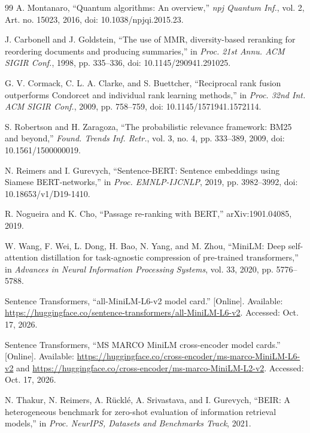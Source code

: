\documentclass[conference]{IEEEtran}
\begin{document}
\begin{thebibliography}{99}
A. Montanaro, ``Quantum algorithms: An overview,'' \textit{npj Quantum Inf.}, vol. 2, Art. no. 15023, 2016, doi: 10.1038/npjqi.2015.23.

J. Carbonell and J. Goldstein, ``The use of MMR, diversity-based reranking for reordering documents and producing summaries,'' in \textit{Proc. 21st Annu. ACM SIGIR Conf.}, 1998, pp. 335--336, doi: 10.1145/290941.291025.

G. V. Cormack, C. L. A. Clarke, and S. Buettcher, ``Reciprocal rank fusion outperforms Condorcet and individual rank learning methods,'' in \textit{Proc. 32nd Int. ACM SIGIR Conf.}, 2009, pp. 758--759, doi: 10.1145/1571941.1572114.

S. Robertson and H. Zaragoza, ``The probabilistic relevance framework: BM25 and beyond,'' \textit{Found. Trends Inf. Retr.}, vol. 3, no. 4, pp. 333--389, 2009, doi: 10.1561/1500000019.

N. Reimers and I. Gurevych, ``Sentence-BERT: Sentence embeddings using Siamese BERT-networks,'' in \textit{Proc. EMNLP-IJCNLP}, 2019, pp. 3982--3992, doi: 10.18653/v1/D19-1410.

R. Nogueira and K. Cho, ``Passage re-ranking with BERT,'' arXiv:1901.04085, 2019.

W. Wang, F. Wei, L. Dong, H. Bao, N. Yang, and M. Zhou, ``MiniLM: Deep self-attention distillation for task-agnostic compression of pre-trained transformers,'' in \textit{Advances in Neural Information Processing Systems}, vol. 33, 2020, pp. 5776--5788.

Sentence Transformers, ``all-MiniLM-L6-v2 model card.'' [Online]. Available: \url{https://huggingface.co/sentence-transformers/all-MiniLM-L6-v2}. Accessed: Oct. 17, 2026.

Sentence Transformers, ``MS MARCO MiniLM cross-encoder model cards.'' [Online]. Available: \url{https://huggingface.co/cross-encoder/ms-marco-MiniLM-L6-v2} and \url{https://huggingface.co/cross-encoder/ms-marco-MiniLM-L2-v2}. Accessed: Oct. 17, 2026.

N. Thakur, N. Reimers, A. R\"uckl\'e, A. Srivastava, and I. Gurevych, ``BEIR: A heterogeneous benchmark for zero-shot evaluation of information retrieval models,'' in \textit{Proc. NeurIPS, Datasets and Benchmarks Track}, 2021.


\end{thebibliography}
\end{document}
